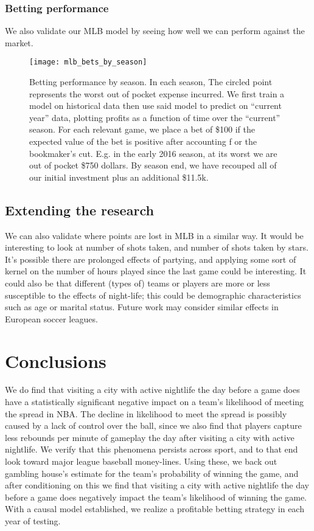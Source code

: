 \documentclass[letterpaper,12pt]{article}
\begin{document}
\subsubsection{Betting performance}
We also validate our MLB model by seeing how well we can perform against the
market.
\begin{figure}[!h]
  \centering
  \texttt{[image: mlb\_bets\_by\_season]}
  \caption{Betting performance by season. In each season, The 
    circled point represents the worst out of pocket expense incurred.
    We first train a model on historical data then use said model to predict on ``current year''
    data, plotting profits as a function of time over the ``current'' season. For each relevant
    game, we place a bet of \$100 if the expected value of the bet is positive after accounting f
    or the bookmaker's cut. E.g. in the     early 2016 season,
    at its worst we are out of pocket \$750 dollars. By season end, we have     recouped all of
    our initial investment plus an additional \$11.5k.}
  \label{bettingperf}
\end{figure}

\clearpage

\subsection{Extending the research}
We can also validate where points are lost in MLB in a similar way.
It would be interesting to look at number of shots taken, and number of shots taken by stars.
It's possible there are prolonged effects of partying, and applying some sort of kernel
on the number of hours played since the last game could be interesting. It could also be
that different (types of) teams or players are more or less susceptible to the effects
of night-life; this could be demographic characteristics such as age or marital status.
Future work may consider similar effects in European soccer leagues.


\section{Conclusions}
We do find that visiting a city with active nightlife the day before a game does have 
a statistically significant negative impact on a team's likelihood of meeting the spread in NBA.
The decline in likelihood to meet the spread is possibly caused by a lack of control over the ball,
since we also find that players capture less rebounds per minute of gameplay the day after
visiting a city with active nightlife. We verify that this phenomena persists across sport, and 
to that end look toward major league baseball money-lines. Using these, we back out gambling
house's estimate for the team's probability of winning the game, and after conditioning on this
we find that visiting a city with active nightlife the day before a game does negatively 
impact the team's likelihood of winning the game.
With a causal model established, we realize a profitable betting strategy in each year of testing.



\end{document}
